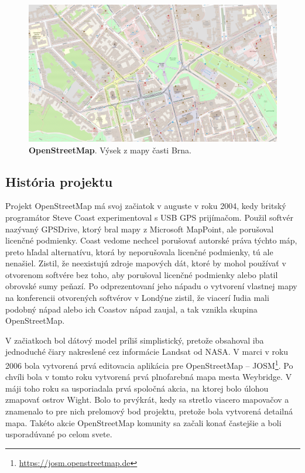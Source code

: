 \begin{figure}[ht]
    \centering
    \includegraphics[width=\linewidth]{obrazky-figures/openstreetmap.png}
    \caption{\textbf{OpenStreetMap}. Výsek z mapy časti Brna.}
    \label{fig:openstreetmap}
\end{figure}

\subsection{História projektu}
Projekt OpenStreetMap má svoj začiatok v auguste v roku 2004, kedy britský programátor Steve Coast experimentoval s USB GPS prijímačom. Použil softvér nazývaný GPSDrive, ktorý bral mapy z Microsoft MapPoint, ale porušoval licenčné podmienky. Coast vedome nechcel porušovať autorské práva týchto máp, preto hľadal alternatívu, ktorá by neporušovala licenčné podmienky, tú ale nenašiel. Zistil, že neexistujú zdroje mapových dát, ktoré by mohol používať v otvorenom softvére bez toho, aby porušoval licenčné podmienky alebo platil obrovské sumy peňazí. Po odprezentovaní jeho nápadu o vytvorení vlastnej mapy na konferencii otvorených softvérov v Londýne zistil, že viacerí ľudia mali podobný nápad alebo ich Coastov nápad zaujal, a tak vznikla skupina OpenStreetMap.

V začiatkoch bol dátový model príliš simplistický, pretože obsahoval iba jednoduché čiary nakreslené cez informácie Landsat od NASA. V marci v roku 2006 bola vytvorená prvá editovacia aplikácia pre OpenStreetMap \--- JOSM\footnote{\url{https://josm.openstreetmap.de}}. Po chvíli bola v tomto roku vytvorená prvá plnofarebná mapa mesta Weybridge. V máji toho roku sa usporiadala prvá spoločná akcia, na ktorej bolo úlohou zmapovať ostrov Wight. Bolo to prvýkrát, kedy sa stretlo viacero mapovačov a znamenalo to pre nich prelomový bod projektu, pretože bola vytvorená detailná mapa. Takéto akcie OpenStreetMap komunity sa začali konať častejšie a boli usporadúvané po celom svete.

